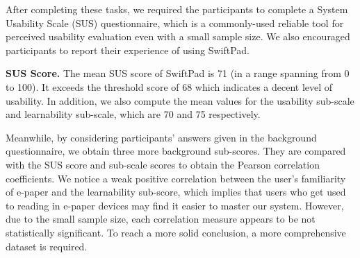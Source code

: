 \documentclass[]{sigchi}
\begin{document}
After completing these tasks, we required the participants to complete a System Usability Scale (SUS) questionnaire, which is a commonly-used reliable tool for perceived usability evaluation even with a small sample size.
We also encouraged participants to report their experience of using SwiftPad.

\textbf{SUS Score.}
The mean SUS score of SwiftPad is 71 (in a range spanning from 0 to 100). It exceeds the threshold score of 68 which  indicates a decent level of usability. 
In addition, we also compute the mean values for the usability sub-scale and learnability sub-scale, which are 70 and 75 respectively. 

Meanwhile, by considering participants' answers given in the background questionnaire, we obtain three more background sub-scores.
They are compared with the SUS score and sub-scale scores to obtain the Pearson correlation coefficients. 
We notice a weak positive correlation between the user's familiarity of e-paper and the learnability sub-score, which implies that users who get used to reading in e-paper devices may find it easier to master our system.
However, due to the small sample size, each correlation measure appears to be not statistically significant. To reach a more solid conclusion, a more comprehensive dataset is required.
\end{document}
